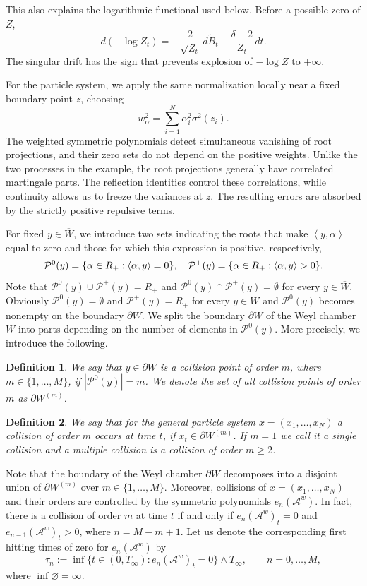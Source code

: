 \documentclass{article}
\numberwithin{equation}{section}
\newcommand{\inner}[2]{\left<#1,#2\right>}
\newcommand{\C}{W}
\newcommand{\Cc}{\overline{W}}
\newcommand{\Cb}{\partial \C}
\newcommand{\Cbm}{\partial \C^{(m)}}
\newcommand{\Aa}{\mathcal{A}^{w}}
\newcommand{\aR}{\alpha\in R_+}
\newcommand{\eA}[1]{e_{#1}(\Aa)}
\newcommand{\Pzero}{\mathcal{P}^0(y)}
\newcommand{\Pplus}{\mathcal{P}^+(y)}
\theoremstyle{plain}
\newtheorem{definition}{Definition}
\begin{document}
This also explains the logarithmic functional used below.
Before a possible zero of $Z$,
\begin{equation*}
    d(-\log Z_t)
    =-\frac{2}{\sqrt{Z_t}}\,d\widetilde B_t
     -\frac{\delta-2}{Z_t}\,dt.
\end{equation*}
The singular drift has the sign that prevents explosion
of $-\log Z$ to $+\infty$.

For the particle system, we apply the same normalization
locally near a fixed boundary point $z$, choosing
\begin{equation*}
    w_\alpha^2
       =\sum_{i=1}^N\alpha_i^2\sigma^2(z_i).
\end{equation*}
The weighted symmetric polynomials detect simultaneous vanishing of root projections, and their zero sets do not depend on the positive weights. Unlike the two processes in the example, the root projections generally have correlated martingale parts. The reflection identities control these correlations, while continuity allows us to freeze the variances at $z$. The resulting errors are absorbed by the strictly positive repulsive terms.

For fixed $y\in \Cc$, we introduce two sets indicating the roots that make $\inner{y}{\alpha}$ equal to zero and those for which this expression is positive, respectively,
  \begin{equation*}
		\Pzero = \{\aR: \inner{\alpha}{y}=0\}\/,\quad           \Pplus = \{\aR: \inner{\alpha}{y}>0\}\/.
  \end{equation*}
Note that $\Pzero \cup \Pplus = R_+$ and $\Pzero \cap \Pplus = \emptyset$ for every $y\in\Cc$. Obviously $\Pzero = \emptyset$ and $\Pplus=R_+$ for every $y\in \C$ and $\Pzero$ becomes nonempty on the boundary $\Cb$. We split the boundary $\Cb$ of the Weyl chamber $\C$ into parts depending on the number of elements in $\Pzero$. More precisely, we introduce the following.
\begin{definition}
	We say that $y\in \Cb $ is \textit{a collision point of order $m$}, where $m\in\{1,\ldots,M\}$, if $|\Pzero|=m$. We denote the set of all collision points of order $m$ as $\Cbm$.
\end{definition}

\begin{definition}
	We say that for the general particle system $x = (x_1,\ldots, x_N)$ a collision of order $m$ occurs at time $t$, if $x_t\in\Cbm$. If $m=1$ we call it \textit{a single collision} and \textit{a multiple collision} is a collision of order $m\geq 2$.
\end{definition}
Note that the boundary of the Weyl chamber $\Cb$ decomposes into a disjoint union of $\Cbm$ over $m\in\{1,\ldots,M\}$. Moreover, collisions of $x=(x_1,\ldots,x_N)$ and their orders are controlled by the symmetric polynomials $\eA{n}$. In fact, there is a collision of order $m$ at time $t$ if and only if $\eA{n}_t = 0$ and $\eA{n-1}_t > 0$, where $n= M-m+1$. 
Let us denote the corresponding first hitting times of zero
for $\eA{n}$ by
    \begin{equation*}
        \tau_n :=\inf\bigl\{t\in(0,T_\infty):\eA{n}_t=0\bigr\} \wedge T_\infty, \qquad n=0,\ldots,M,
    \end{equation*}
where $\inf\varnothing=\infty$.
\end{document}
